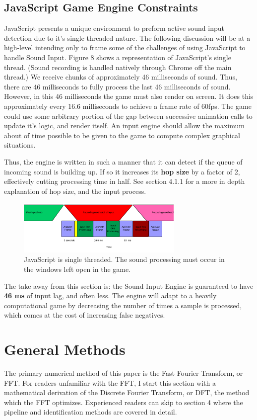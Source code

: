\documentclass[DIV=calc, paper=a4, fontsize=11pt, twocolumn]{scrartcl}   %
\begin{document}
\subsection{JavaScript Game Engine Constraints}
JavaScript presents a unique environment to preform active sound input detection due to it's single threaded nature. The following discussion will be at a high-level intending only to frame some of the challenges of using JavaScript to handle Sound Input. Figure 8 shows a representation of JavaScript's single thread. (Sound recording is handled natively through Chrome off the main thread.) We receive chunks of approximately 46 milliseconds of sound. Thus, there are 46 milliseconds to fully process the last 46 milliseconds of sound. However, in this 46 milliseconds the game must also render on screen. It does this approximately every 16.6 milliseconds to achieve a frame rate of 60fps. The game could use some arbitrary portion of the gap between successive animation calls to update it's logic, and render itself. An input engine should allow the maximum about of time possible to be given to the game to compute complex graphical situations.
\par Thus, the engine is written in such a manner that it can detect if the queue of incoming sound is building up. If so it increases its \textbf{hop size} by a factor of 2, effectively cutting processing time in half. See section 4.1.1 for a more in depth explanation of hop size, and the input process.
\begin{figure}[h]
\centering
\includegraphics[width=80mm]{figures/JavascriptEventLoop.png}
\caption{JavaScript is single threaded. The sound processing must occur in the windows left open in the game.}
\label{overflow}
\end{figure}

\par The take away from this section is: the Sound Input Engine is guaranteed to  have \textbf{46 ms} of input lag, and often less. The engine will adapt to a heavily computational game by decreasing the number of times a sample is processed, which comes at the cost of increasing false negatives.


\section{General Methods}
The primary numerical method of this paper is the Fast Fourier Transform, or FFT. For readers unfamiliar with the FFT, I start this section with a mathematical derivation of the Discrete Fourier Transform, or DFT, the method which the FFT optimizes. Experienced readers can skip to section 4 where the pipeline and identification methods are covered in detail.
\end{document}
